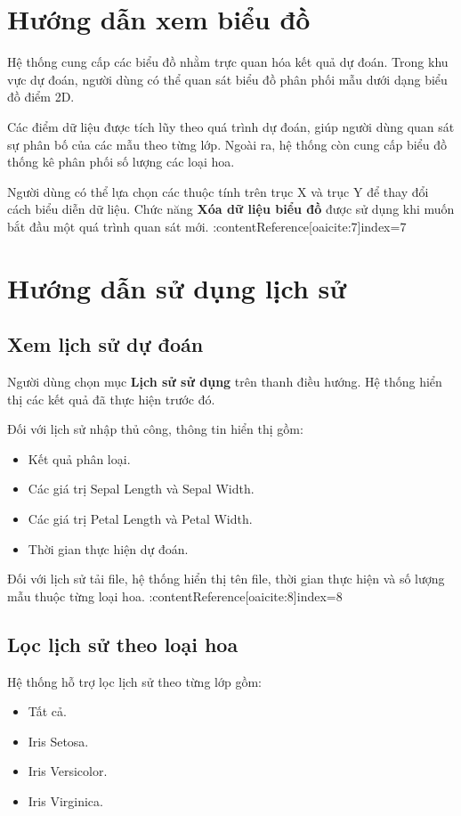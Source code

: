 \documentclass[12pt,a4paper]{report}
\begin{document}
	\section{Hướng dẫn xem biểu đồ}
	
	Hệ thống cung cấp các biểu đồ nhằm trực quan hóa kết quả dự đoán. Trong khu vực dự đoán, người dùng có thể quan sát biểu đồ phân phối mẫu dưới dạng biểu đồ điểm 2D.
	
	Các điểm dữ liệu được tích lũy theo quá trình dự đoán, giúp người dùng quan sát sự phân bố của các mẫu theo từng lớp. Ngoài ra, hệ thống còn cung cấp biểu đồ thống kê phân phối số lượng các loại hoa.
	
	Người dùng có thể lựa chọn các thuộc tính trên trục X và trục Y để thay đổi cách biểu diễn dữ liệu. Chức năng \textbf{Xóa dữ liệu biểu đồ} được sử dụng khi muốn bắt đầu một quá trình quan sát mới. :contentReference[oaicite:7]{index=7}
	
	\section{Hướng dẫn sử dụng lịch sử}
	
	\subsection{Xem lịch sử dự đoán}
	
	Người dùng chọn mục \textbf{Lịch sử sử dụng} trên thanh điều hướng. Hệ thống hiển thị các kết quả đã thực hiện trước đó.
	
	Đối với lịch sử nhập thủ công, thông tin hiển thị gồm:
	\begin{itemize}
		\item Kết quả phân loại.
		\item Các giá trị Sepal Length và Sepal Width.
		\item Các giá trị Petal Length và Petal Width.
		\item Thời gian thực hiện dự đoán.
	\end{itemize}
	
	Đối với lịch sử tải file, hệ thống hiển thị tên file, thời gian thực hiện và số lượng mẫu thuộc từng loại hoa. :contentReference[oaicite:8]{index=8}
	
	\subsection{Lọc lịch sử theo loại hoa}
	
	Hệ thống hỗ trợ lọc lịch sử theo từng lớp gồm:
	\begin{itemize}
		\item Tất cả.
		\item Iris Setosa.
		\item Iris Versicolor.
		\item Iris Virginica.
	\end{itemize}
	
\end{document}
